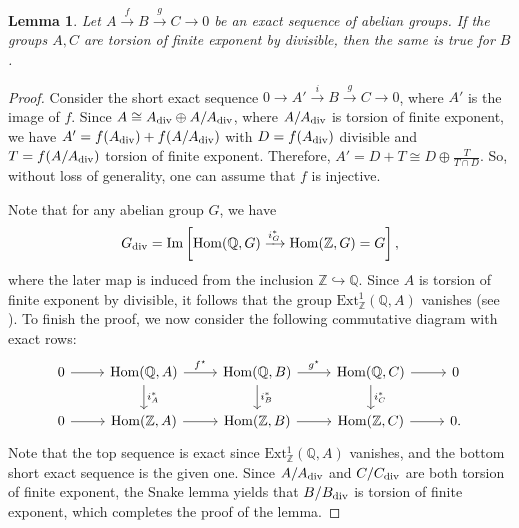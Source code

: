 \documentclass[12pt]{amsart}
\newtheorem{lem}[lem]{Lemma}
\theoremstyle{remark}
\renewcommand{\1}{{\mathbb{S}}}
\newcommand{\<}{\langle}
\renewcommand{\>}{\rangle}
\newcommand{\img}{{\rm Im}}
\newcommand{\dv}{{\rm div}}
\begin{document}
\begin{lem}\label{lem:F+D} Let $A\xrightarrow{f} B\xrightarrow{g} C\to 0$ be an exact sequence of abelian groups. If the groups $A,C$ are torsion of finite exponent by divisible, then the same is true for $B$.    
\end{lem}	
\begin{proof}


Consider the short exact sequence $ 0 \rightarrow A'\xrightarrow{i} B\xrightarrow{g} C\to 0$, where $A'$ is the image of $f$. Since $A \cong A_{\dv} \oplus A/A_{\dv}$, where $A/A_{\dv}$ is torsion of finite exponent, we have $A' = f(A_{\dv}) + f(A/A_{\dv})$ with $D=f(A_{\dv})$  divisible and $T =  f(A/A_{\dv})$ torsion of finite exponent. Therefore,  $\displaystyle A' = D + T  \cong D \oplus \frac{T}{T \cap D}$.  So, without loss of generality, one can assume that $f$ is injective. 

Note that for any abelian group $G$, we have \[G_{\dv} = \img\left[\operatorname{Hom}(\mathbb{Q}, G) \xrightarrow{i_{G}^{\ast}} \operatorname{Hom}(\mathbb{Z}, G) = G\right],\] where the later map is induced from the inclusion $\mathbb{Z} \hookrightarrow \mathbb{Q}$. Since $A$ is torsion of finite exponent by divisible, it follows that the group $\operatorname{Ext^{1}_{\mathbb{Z}}}(\mathbb{Q}, A)  $ vanishes (see \cite[Proposition 7.33]{Rot}). 
To finish the proof, we now consider the following commutative diagram with exact rows:
\[
\begin{tikzcd}
0 \arrow[r] &  \operatorname{Hom}(\mathbb{Q}, A) \arrow[r, "f^\star"] \arrow[d, "i_{A}^{\ast}"] & \operatorname{Hom}(\mathbb{Q}, B) \arrow[r, "g^\star"] \arrow[d, "i_{B}^{\ast}"] & \operatorname{Hom}(\mathbb{Q}, C) \arrow[r] \arrow[d, "i_{C}^{\ast}"] & 0 \\
0 \arrow[r] & \operatorname{Hom}(\mathbb{Z}, A) \arrow[r] & \operatorname{Hom}(\mathbb{Z}, B)\arrow[r] & \operatorname{Hom}(\mathbb{Z}, C) \arrow[r] & 0.
\end{tikzcd} 
\]
Note that the top sequence is exact since $\operatorname{Ext^{1}_{\mathbb{Z}}}(\mathbb{Q}, A)$ vanishes, and the bottom short exact sequence is the given one. Since $A/A_{\dv}$ and $C/C_{\dv}$ are  both torsion of finite exponent, the Snake lemma yields that $B/B_{\dv}$ is torsion of finite exponent, which completes the proof of the lemma. 






	\end{proof}
\end{document}
